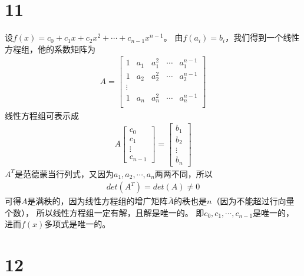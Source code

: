 \documentclass{article}
\begin{document}
\section*{11}

设$f(x) = c_0 + c_1 x + c_2 x^2 + \cdots + c_{n - 1} x^{n - 1}$。
由$f(a_i) = b_i$，我们得到一个线性方程组，他的系数矩阵为
\begin{align*}
  A = \begin{bmatrix}
        1 & a_1 & a_1^2 & \cdots & a_{1}^{n - 1} \\
        1 & a_2 & a_2^2 & \cdots & a_{2}^{n - 1} \\
        \vdots                                   \\
        1 & a_n & a_n^2 & \cdots & a_{n}^{n - 1} \\
      \end{bmatrix}
\end{align*}
线性方程组可表示成
\begin{align*}
  A \begin{bmatrix}
      c_0    \\
      c_1    \\
      \vdots \\
      c_{n - 1}
    \end{bmatrix}
  = \begin{bmatrix}
      b_1    \\
      b_2    \\
      \vdots \\
      b_{n}
    \end{bmatrix}
\end{align*}
$A^T$是范德蒙当行列式，又因为$a_1, a_2, \cdots, a_n$两两不同，所以
\begin{align*}
  det(A^T) = det(A) \neq 0
\end{align*}
可得$A$是满秩的，因为线性方程组的增广矩阵$\overline{A}$的秩也是$n$（因为不能超过行向量个数），
所以线性方程组一定有解，且解是唯一的。
即$c_0, c_1, \cdots, c_{n - 1}$是唯一的，
进而$f(x)$多项式是唯一的。

\section*{12}
\end{document}
